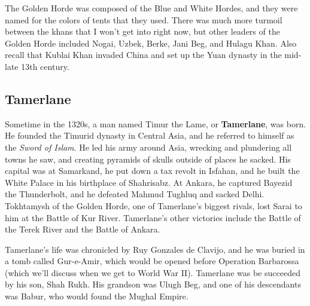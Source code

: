 The Golden Horde was composed of the Blue and White Hordes,
and they were named for the colors of tents that they used.
There was much more turmoil between the khans that I won't get into right now,
but other leaders of the Golden Horde included Nogai, Uzbek, Berke, Jani Beg, and Hulagu Khan.
Also recall that Kublai Khan invaded China and set up the Yuan dynasty in the mid-late 13th century.

\subsection*{Tamerlane}

Sometime in the 1320s, a man named Timur the Lame, or \textbf{Tamerlane}, was born.
He founded the Timurid dynasty in Central Asia, and he referred to himself as the \textit{Sword of Islam}.
He led his army around Asia, wrecking and plundering all towns he saw,
and creating pyramids of skulls outside of places he sacked.
His capital was at Samarkand, he put down a tax revolt in Isfahan,
and he built the White Palace in his birthplace of Shahrisabz.
At Ankara, he captured Bayezid the Thunderbolt,
and he defeated Mahmud Tughluq and sacked Delhi.
Tokhtamysh of the Golden Horde, one of Tamerlane's biggest rivals, lost Sarai to him at the Battle of Kur River.
Tamerlane's other victories include the Battle of the Terek River and the Battle of Ankara.

Tamerlane's life was chronicled by Ruy Gonzales de Clavijo, and he was buried in a tomb called Gur-e-Amir,
which would be opened before Operation Barbarossa (which we'll discuss when we get to World War II).
Tamerlane was be succeeded by his son, Shah Rukh.
His grandson was Ulugh Beg, and one of his descendants was Babur, who would found the Mughal Empire.
